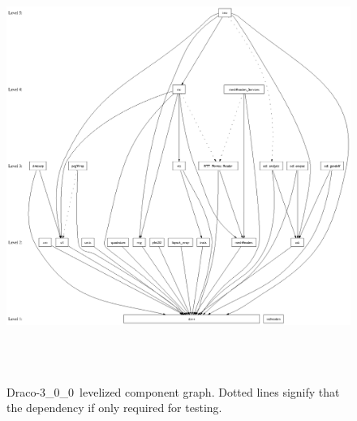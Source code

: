 \documentclass[11pt]{../tex/nmemo}
\newcommand{\draco}{Draco}
\newcommand{\dracor}{\draco-3\_0\_0}
\begin{document}
\begin{figure}
  \label{fig:level}
  \centerline{
    \includegraphics[height=5.5in]{level-3_0_0.ps}}
  \caption{\dracor\ levelized component graph.  Dotted lines signify
    that the dependency if only required for testing.}
\end{figure}
\end{document}
